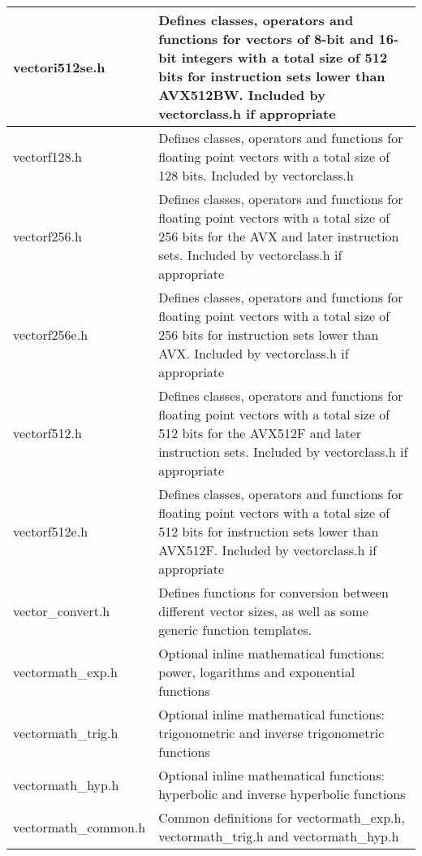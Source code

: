 \documentclass[vcl_manual.tex]{subfiles}
\begin{document}
\begin{longtable}[l]{|p{40mm}|p{100mm}|}
vectori512se.h & Defines classes, operators and functions for vectors of 8-bit and 16-bit integers  with a total size of 512 bits for instruction sets lower than
AVX512BW. Included by vectorclass.h if appropriate \\ \hline

vectorf128.h & Defines classes, operators and functions for floating point vectors with a total size of 128 bits. Included by vectorclass.h \\ \hline

vectorf256.h & Defines classes, operators and functions for floating point vectors with a total size of 256 bits for the AVX and later instruction sets. Included by vectorclass.h if appropriate \\ \hline

vectorf256e.h & Defines classes, operators and functions for floating point vectors with a total size of 256 bits for instruction sets lower than AVX. Included by vectorclass.h if appropriate \\ \hline

vectorf512.h & Defines classes, operators and functions for floating point vectors with a total size of 512 bits for the AVX512F and later instruction sets. Included by vectorclass.h if appropriate \\ \hline

vectorf512e.h & Defines classes, operators and functions for floating point vectors with a total size of 512 bits for instruction sets lower than AVX512F. Included by vectorclass.h if appropriate \\ \hline

vector\_convert.h & Defines functions for conversion between different vector sizes, as well as some generic function templates. \\ \hline

vectormath\_exp.h & Optional inline mathematical functions: power, logarithms and exponential functions \\ \hline

vectormath\_trig.h & Optional inline mathematical functions: trigonometric and inverse trigonometric functions \\ \hline

vectormath\_hyp.h & Optional inline mathematical functions: hyperbolic and inverse hyperbolic functions \\ \hline

vectormath\_common.h & Common definitions for vectormath\_exp.h, vectormath\_trig.h and vectormath\_hyp.h \\ \hline


\end{longtable}
\end{document}
